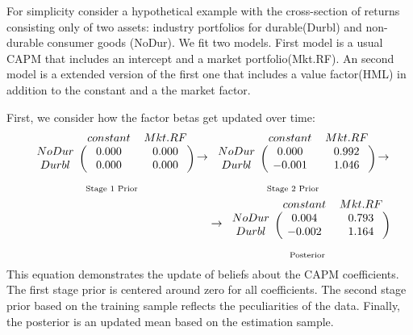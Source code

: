 For simplicity consider a hypothetical example with the cross-section of returns consisting only of  two assets: industry portfolios for durable(Durbl) and non-durable consumer goods (NoDur).
We fit two models.
First model is a usual CAPM that includes an intercept and a market portfolio(Mkt.RF). 
An second model is a extended version of the first one that includes a value factor(HML) in addition to the constant and a the market factor. 

First, we consider how the factor betas get updated over time:
\begin{eqnarray*}
\underset{\text{Stage 1 Prior}}
{\begin{blockarray}{ccc}
	& constant & Mkt.RF  \\ 
	\begin{block}{c(cc)}
	NoDur & 0.000 & 0.000 \\ 
	Durbl & 0.000 & 0.000 \\ 
	\end{block}
\end{blockarray} }
\rightarrow
\underset{\text{Stage 2 Prior}}
{\begin{blockarray}{ccc}
	& constant & Mkt.RF \\ 
	\begin{block}{c(cc)}
	NoDur & 0.000 & 0.992 \\ 
	Durbl & -0.001 & 1.046 \\ 
	\end{block}
\end{blockarray} }
\rightarrow \\
\rightarrow
\underset{\text{Posterior}}
{\begin{blockarray}{ccc}
	& constant & Mkt.RF \\ 
	\begin{block}{c(cc)}
	NoDur & 0.004 & 0.793 \\ 
	Durbl & -0.002 & 1.164 \\ 
	\end{block}
\end{blockarray}}
\end{eqnarray*}
This equation demonstrates the update of beliefs about the CAPM coefficients.
The first stage prior is centered around zero for all coefficients. 
The second stage prior based on the training sample reflects the peculiarities of the data. 
Finally, the posterior is an updated mean based on the estimation sample. 
